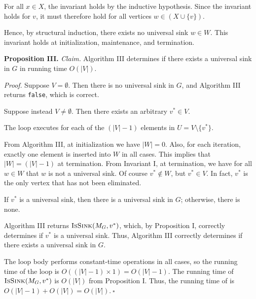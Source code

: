 \begin{enumerate}
\begin{solution}
For all $x\in X$, the invariant holds by the inductive hypothesis. Since the invariant holds for $v$, it must therefore hold for all vertices $w\in(X\cup\{v\})$.

Hence, by structural induction, there exists no universal sink $w\in W$. This invariant holds at initialization, maintenance, and termination.

\textbf{Proposition III. }\textit{Claim. }Algorithm III determines if there exists a universal sink in $G$ in running time $O(|V|)$.

\textit{Proof. }Suppose $V=\emptyset$. Then there is no universal sink in $G$, and Algorithm III returns \verb|false|, which is correct.

Suppose instead $V\neq\emptyset$. Then there exists an arbitrary $v^*\in V$. 

The loop executes for each of the $(|V|-1)$ elements in $U=V\setminus\{v^*\}$.

From Algorithm III, at initialization we have $|W|=0$. Also, for each iteration, exactly one element is inserted into $W$ in all cases. This implies that $|W|=(|V|-1)$ at termination. From Invariant I, at termination, we have for all $w\in W$ that $w$ is not a universal sink. Of course $v^*\notin W$, but $v^*\in V$. In fact, $v^*$ is the only vertex that has not been eliminated.

If $v^*$ is a universal sink, then there is a universal sink in $G$; otherwise, there is none.

Algorithm III returns $\textsc{IsSink}(M_G,v^*)$, which, by Proposition I, correctly determines if $v^*$ is a universal sink. Thus, Algorithm III correctly determines if there exists a universal sink in $G$.

The loop body performs constant-time operations in all cases, so the running time of the loop is $O((|V|-1)\times 1)=O(|V|-1)$. The running time of $\textsc{IsSink}(M_G,v^*)$ is $O(|V|)$ from Proposition I. Thus, the running time of  is $O(|V|-1)+O(|V|)=O(|V|).~\square$
\end{solution}
\end{enumerate}
